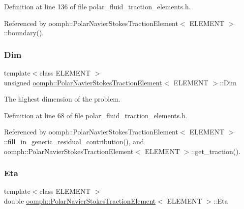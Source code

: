 Definition at line 136 of file polar\+\_\+fluid\+\_\+traction\+\_\+elements.\+h.



Referenced by oomph\+::\+Polar\+Navier\+Stokes\+Traction\+Element$<$ E\+L\+E\+M\+E\+N\+T $>$\+::boundary().

\mbox{\label{classoomph_1_1PolarNavierStokesTractionElement_a7db691fc3415d54a2a2497a2d0b7aee5}} 
\subsubsection{\texorpdfstring{Dim}{Dim}}
{\footnotesize\ttfamily template$<$class E\+L\+E\+M\+E\+NT $>$ \\
unsigned \hyperlink{classoomph_1_1PolarNavierStokesTractionElement}{oomph\+::\+Polar\+Navier\+Stokes\+Traction\+Element}$<$ E\+L\+E\+M\+E\+NT $>$\+::Dim\hspace{0.3cm}{\ttfamily [private]}}



The highest dimension of the problem. 



Definition at line 68 of file polar\+\_\+fluid\+\_\+traction\+\_\+elements.\+h.



Referenced by oomph\+::\+Polar\+Navier\+Stokes\+Traction\+Element$<$ E\+L\+E\+M\+E\+N\+T $>$\+::fill\+\_\+in\+\_\+generic\+\_\+residual\+\_\+contribution(), and oomph\+::\+Polar\+Navier\+Stokes\+Traction\+Element$<$ E\+L\+E\+M\+E\+N\+T $>$\+::get\+\_\+traction().

\mbox{\label{classoomph_1_1PolarNavierStokesTractionElement_ae80d473cf67d10d4ffe7e3124a9ffce9}} 
\subsubsection{\texorpdfstring{Eta}{Eta}}
{\footnotesize\ttfamily template$<$class E\+L\+E\+M\+E\+NT $>$ \\
double \hyperlink{classoomph_1_1PolarNavierStokesTractionElement}{oomph\+::\+Polar\+Navier\+Stokes\+Traction\+Element}$<$ E\+L\+E\+M\+E\+NT $>$\+::Eta\hspace{0.3cm}{\ttfamily [protected]}}



